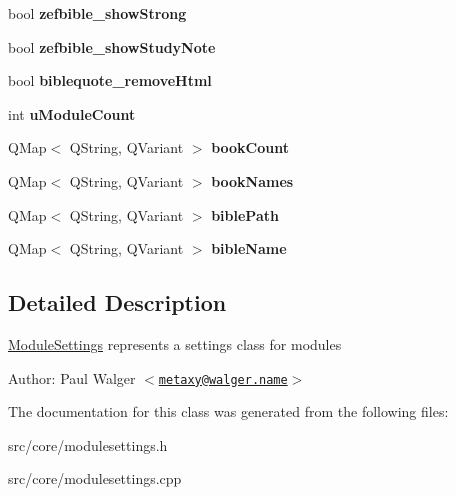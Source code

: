 \begin{CompactItemize}
\item 
\hypertarget{classModuleSettings_511bd56eead503c3be216489066f100f}{
bool \textbf{zefbible\_\-showStrong}}
\label{classModuleSettings_511bd56eead503c3be216489066f100f}

\item 
\hypertarget{classModuleSettings_855e48f769627a54b2643a872e5838ac}{
bool \textbf{zefbible\_\-showStudyNote}}
\label{classModuleSettings_855e48f769627a54b2643a872e5838ac}

\item 
\hypertarget{classModuleSettings_8fd9c1bd55ee42af5ee9b24e4fe6ee92}{
bool \textbf{biblequote\_\-removeHtml}}
\label{classModuleSettings_8fd9c1bd55ee42af5ee9b24e4fe6ee92}

\item 
\hypertarget{classModuleSettings_e1c590d226d0b7c994f1b2cc85de342e}{
int \textbf{uModuleCount}}
\label{classModuleSettings_e1c590d226d0b7c994f1b2cc85de342e}

\item 
\hypertarget{classModuleSettings_4b1acf7fab7f33a9daa83a6043216d75}{
QMap$<$ QString, QVariant $>$ \textbf{bookCount}}
\label{classModuleSettings_4b1acf7fab7f33a9daa83a6043216d75}

\item 
\hypertarget{classModuleSettings_8e111bc80c36144142f2249d58d8be0f}{
QMap$<$ QString, QVariant $>$ \textbf{bookNames}}
\label{classModuleSettings_8e111bc80c36144142f2249d58d8be0f}

\item 
\hypertarget{classModuleSettings_40622a8984b16c59c645a304f6c7b3d6}{
QMap$<$ QString, QVariant $>$ \textbf{biblePath}}
\label{classModuleSettings_40622a8984b16c59c645a304f6c7b3d6}

\item 
\hypertarget{classModuleSettings_a5a936a337616dc4edcc2b2b4dbeaae8}{
QMap$<$ QString, QVariant $>$ \textbf{bibleName}}
\label{classModuleSettings_a5a936a337616dc4edcc2b2b4dbeaae8}

\end{CompactItemize}


\subsection{Detailed Description}
\hyperlink{classModuleSettings}{ModuleSettings} represents a settings class for modules

\begin{Desc}
\item[Author:]Paul Walger $<$\href{mailto:metaxy@walger.name}{\tt metaxy@walger.name}$>$ \end{Desc}


The documentation for this class was generated from the following files:\begin{CompactItemize}
\item 
src/core/modulesettings.h\item 
src/core/modulesettings.cpp\end{CompactItemize}
